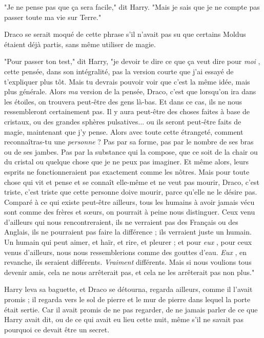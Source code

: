 "Je ne pense pas que ça sera facile," dit Harry. "Mais je sais que je ne compte pas passer toute ma vie sur Terre."

Draco se serait moqué de cette phrase s'il n'avait pas su que certains Moldus étaient déjà partis, sans même utiliser de magie.

"Pour passer ton test," dit Harry, "je devoir te dire ce que ça veut dire pour \emph{moi} , cette pensée, dans son intégralité, pas la version courte que j'ai essayé de t'expliquer plus tôt. Mais tu devrais pouvoir voir que c'est la même idée, mais plus générale. Alors \emph{ma}  version de la pensée, Draco, c'est que lorsqu'on ira dans les étoiles, on trouvera peut-être des gens là-bas. Et dans ce cas, ils ne nous ressembleront certainement pas. Il y aura peut-être des choses faites à base de cristaux, ou des grandes sphères pulsatives... ou ils seront peut-être faits de magie, maintenant que j'y pense. Alors avec toute cette étrangeté, comment reconnaîtras-tu une \emph{personne}  ? Pas par sa forme, pas par le nombre de ses bras ou de ses jambes. Pas par la substance qui la compose, que ce soit de la chair ou du cristal ou quelque chose que je ne peux pas imaginer. Et même alors, leurs esprits ne fonctionneraient pas exactement comme les nôtres. Mais pour toute chose qui vit et pense et se connaît elle-même et ne veut pas mourir, Draco, c'est triste, c'est triste que cette personne doive mourir, parce qu'elle ne le désire pas. Comparé à ce qui existe peut-être ailleurs, tous les humains à avoir jamais vécu sont comme des frères et sœurs, on pourrait à peine nous distinguer. Ceux venu d'ailleurs qui nous rencontreraient, ils ne verraient pas des Français ou des Anglais, ils ne pourraient pas faire la différence ; ils verraient juste un humain. Un humain qui peut aimer, et haïr, et rire, et pleurer ; et pour \emph{eux} , pour ceux venus d'ailleurs, nous nous ressemblerions comme des gouttes d'eau. \emph{Eux} , en revanche, ils seraient différents. \emph{Vraiment}  différents. Mais si nous voulions tous devenir amis, cela ne nous arrêterait pas, et cela ne les arrêterait pas non plus."

Harry leva sa baguette, et Draco se détourna, regarda ailleurs, comme il l'avait promis ; il regarda vers le sol de pierre et le mur de pierre dans lequel la porte était sertie. Car il avait promis de ne pas regarder, de ne jamais parler de ce que Harry avait dit, ou de ce qui avait eu lieu cette nuit, même s'il ne savait pas pourquoi ce devait être un secret.


